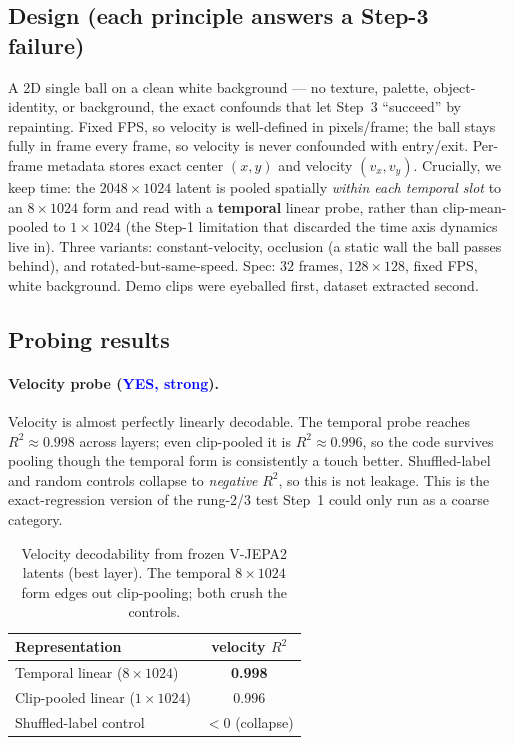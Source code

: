 \documentclass{article} %
\newcommand{\vjepa}{V-JEPA2}
\begin{document}
  \subsection{Design (each principle answers a Step-3 failure)}
  A 2D single ball on a clean white background --- no texture, palette, object-identity, or background,
  the
  exact confounds that let Step~3 ``succeed'' by repainting. Fixed FPS, so velocity is well-defined in
  pixels/frame; the ball stays fully in frame every frame, so velocity is never confounded with
  entry/exit. Per-frame metadata stores exact center $(x,y)$ and velocity $(v_x,v_y)$. Crucially, we keep
  time: the $2048\times1024$ latent is pooled spatially \emph{within each temporal slot} to an
  $8\times1024$ form and read with a \textbf{temporal} linear probe, rather than clip-mean-pooled to
  $1\times1024$ (the Step-1 limitation that discarded the time axis dynamics live in). Three variants:
  constant-velocity, occlusion (a static wall the ball passes behind), and rotated-but-same-speed.
  Spec: $32$ frames, $128\times128$, fixed FPS, white background. Demo clips were eyeballed first,
  dataset
  extracted second.

  \subsection{Probing results}

  \paragraph{Velocity probe (\textcolor{blue}{YES, strong}).}
  Velocity is almost perfectly linearly decodable. The temporal probe reaches $R^2\approx0.998$ across
  layers; even clip-pooled it is $R^2\approx0.996$, so the code survives pooling though the temporal form
  is consistently a touch better. Shuffled-label and random controls collapse to \emph{negative} $R^2$,
  so
  this is not leakage. This is the exact-regression version of the rung-2/3 test Step~1 could only run as
  a
  coarse category.

  \begin{table}[h]
  \caption{Velocity decodability from frozen \vjepa{} latents (best layer). The temporal $8\times1024$
  form
  edges out clip-pooling; both crush the controls.}
  \label{tab:vel_probe}
  \begin{center}
  \begin{tabular}{lc}
  \toprule
  \textbf{Representation} & \textbf{velocity $R^2$} \\
  \midrule
  Temporal linear ($8\times1024$) & \textbf{0.998} \\
  Clip-pooled linear ($1\times1024$) & 0.996 \\
  Shuffled-label control & $<0$ (collapse) \\
  \bottomrule
  \end{tabular}
  \end{center}
  \end{table}
\end{document}
